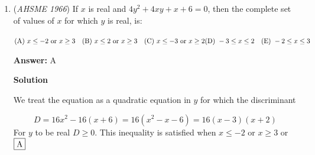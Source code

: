 \begin{enumerate}
 
 \[ab = 0\]

 This implies that either $a = 0$ or $b = 0$. Therefore, there are solutions other than $a = 0$ and $b = 0$, such as $a = 0$ and $b \neq 0$, or $a \neq 0$ and $b = 0$.

 \textbf{Conclusion for Statement (III):} There are solutions other than $a = 0$ and $b = 0$.

 \textbf{Statement (IV):} $\sqrt{a^2 + b^2} = a - b$

 Squaring both sides:

 
 \[a^2 + b^2 = (a - b)^2\]

 Expanding the right-hand side:

 
 \[a^2 + b^2 = a^2 - 2ab + b^2\]

 Canceling $a^2 + b^2$ from both sides:

 
 \[0 = -2ab\]

 Thus:

 
 \[ab = 0\]

 This implies that either $a = 0$ or $b = 0$. Therefore, there are solutions other than $a = 0$ and $b = 0$, such as $a = 0$ and $b \neq 0$, or $a \neq 0$ and $b = 0$.

 \textbf{Conclusion for Statement (IV):} There are solutions other than $a = 0$ and $b = 0$.

 \textbf{Final Conclusion:}

 The statements that have solutions other than $a = 0$ and $b = 0$ are (III) and (IV).

 Thus, the correct answer is:

 
 \[\boxed{\text{(A) (I), (II), (III), (IV)}}\]



	\item (\textit{AHSME 1966}) If $x$ is real and $4y^2+4xy+x+6=0$, then the complete set of values of $x$ for which $y$ is real, is:


 $\text{(A) } x\le-2 \text{ or } x\ge3 \quad \text{(B) }  x\le2 \text{ or } x\ge3 \quad \text{(C) }  x\le-3 \text{ or } x\ge2 \quad \\ \text{(D) } -3\le x\le2 \quad \text{(E) } -2\le x\le3$

 \textbf{Answer: }A



\textbf{Solution}

We treat the equation as a quadratic equation in $y$ for which the discriminant 

 
 \[D=16x^2-16(x+6)=16(x^2-x-6)=16(x-3)(x+2)\] For $y$ to be real $D \ge 0$. This inequality is satisfied when $x \le -2$ or $x \ge3$ or $\fbox{A}$




\end{enumerate}
